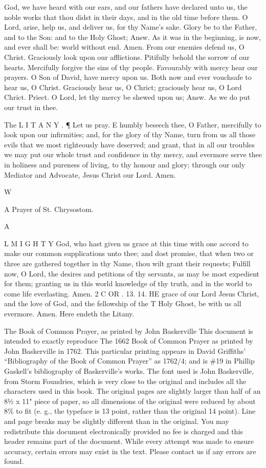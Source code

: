 God, we have heard with our ears, and our fathers have declared unto us, the noble works that thou didst in their days, and in the old time before them. O Lord, arise, help us, and deliver us, for thy Name's sake. Glory be to the Father, and to the Son: and to the Holy Ghost; Answ. As it was in the beginning, is now, and ever shall be: world without end. Amen. From our enemies defend us, O Christ. Graciously look upon our afflictions. Pitifully behold the sorrow of our hearts. Mercifully forgive the sins of thy people. Favourably with mercy hear our prayers. O Son of David, have mercy upon us. Both now and ever vouchsafe to hear us, O Christ. Graciously hear us, O Chrict; graciously hear us, O Lord Chrict. Priect. O Lord, let thy mercy be shewed upon us; Answ. As we do put our trust in thee.

The L I T A N Y . ¶ Let us pray. E humbly beseech thee, O Father, mercifully to look upon our infirmities; and, for the glory of thy Name, turn from us all those evils that we most righteously have deserved; and grant, that in all our troubles we may put our whole trust and confidence in thy mercy, and evermore serve thee in holiness and pureness of living, to thy honour and glory; through our only Mediator and Advocate, Jesus Christ our Lord. Amen.

W

A Prayer of St. Chrysostom.

A

L M I G H T Y God, who hast given us grace at this time with one accord to make our common supplications unto thee; and dost promise, that when two or three are gathered together in thy Name, thou wilt grant their requests; Fulfill now, O Lord, the desires and petitions of thy servants, as may be most expedient for them; granting us in this world knowledge of thy truth, and in the world to come life everlasting. Amen. 2 C OR . 13. 14. HE grace of our Lord Jesus Christ, and the love of God, and the fellowship of the T Holy Ghost, be with us all evermore. Amen. Here endeth the Litany.


The Book of Common Prayer, as printed by John Baskerville This document is intended to exactly reproduce The 1662 Book of Common Prayer as printed by John Baskerville in 1762. This particular printing appears in David Griffiths' “Bibliography of the Book of Common Prayer” as 1762/4; and is \#19 in Phillip Gaskell's bibliography of Baskerville's works. The font used is John Baskerville, from Storm Foundries, which is very close to the original and includes all the characters used in this book. The original pages are slightly larger than half of an 8½ x 11" piece of paper, so all dimensions of the original were reduced by about 8\% to fit (e. g., the typeface is 13 point, rather than the original 14 point). Line and page breaks may be slightly different than in the original. You may redistribute this document electronically provided no fee is charged and this header remains part of the document. While every attempt was made to ensure accuracy, certain errors may exist in the text. Please contact us if any errors are found.

